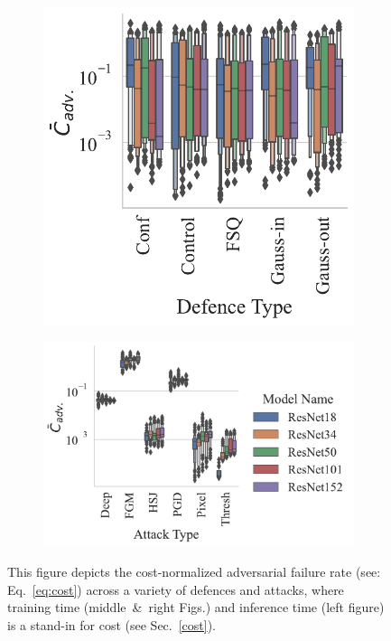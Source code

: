 \begin{figure}
\begin{subfigure}{0.3\textwidth}
        \includegraphics[width=\textwidth]{cifar/adv_failures_per_train_time_vs_defence_type.pdf}
        \centering
    \end{subfigure}
    \begin{subfigure}{0.35\textwidth}
        \includegraphics[width=\textwidth]{cifar/adv_failures_per_train_time_vs_attack_type.pdf}
        \centering
    \end{subfigure}
    \caption{This figure depicts the cost-normalized adversarial failure rate (see: Eq.~\ref{eq:cost}) across a variety of defences and attacks, where training time (middle~\&~right Figs.) and inference time (left figure) is a stand-in for cost (see Sec.~\ref{cost}).}
    \label{fig:failures_per_train_time}
\end{figure}

